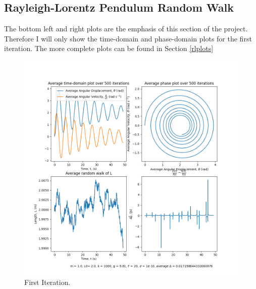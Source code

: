 \documentclass[10pt, twocolumn]{article}
\begin{document}
\subsection{Rayleigh-Lorentz Pendulum Random Walk}{\label{rlresults}}
The bottom left and right plots are the emphasis of this section of the project. Therefore I will only show the time-domain and phase-domain plots for the first iteration. The more complete plots can be found in Section \ref{rlplots}
\begin{figure}
    \centering
    \includegraphics[width = \columnwidth]{Projects/ForcedSimplePendulum/Plots/m = 1.0, L0= 2.0, k = 1000, g = 9.81, F = 20, sigma = 1e-10, run number 0.png}
    \caption{First Iteration.}
    \label{fig:enter-label}
\end{figure}
\end{document}
